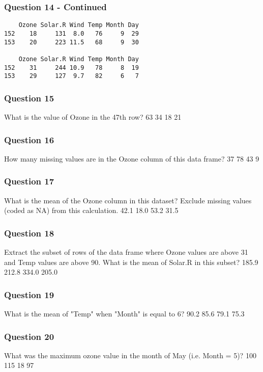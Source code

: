 \begin{frame}
\frametitle{Question 14 - Continued}
\Large
\begin{verbatim} 
    Ozone Solar.R Wind Temp Month Day
152    18     131  8.0   76     9  29
153    20     223 11.5   68     9  30
 
    Ozone Solar.R Wind Temp Month Day
152    31     244 10.9   78     8  19
153    29     127  9.7   82     6   7
\end{verbatim}
\end{frame}
\begin{frame}
\frametitle{Question 15}
\Large
What is the value of Ozone in the 47th row?
63
34
18
21
\end{frame}
\begin{frame}
\frametitle{Question 16}
\Large
How many missing values are in the Ozone column of this data frame?
37
78
43
9
\end{frame}
\begin{frame}
\frametitle{Question 17}
\Large
What is the mean of the Ozone column in this dataset? Exclude missing values (coded as NA) from this calculation.
42.1
18.0
53.2
31.5
\end{frame}
\begin{frame}
\frametitle{Question 18}
\Large
Extract the subset of rows of the data frame where Ozone values are above 31 and Temp values are above 90. What is the mean of Solar.R in this subset?
185.9
212.8
334.0
205.0
\end{frame}
\begin{frame}
\frametitle{Question 19}
\Large
What is the mean of "Temp" when "Month" is equal to 6?
90.2
85.6
79.1
75.3
\end{frame}
\begin{frame}
\frametitle{Question 20}
\Large
What was the maximum ozone value in the month of May (i.e. Month = 5)?
100
115
18
97
\end{frame}

